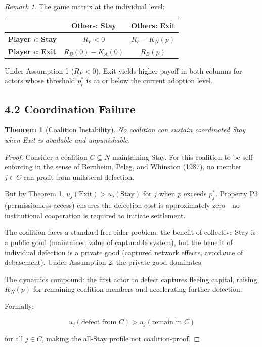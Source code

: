 \documentclass[12pt]{article}
\newtheorem{theorem}{Theorem}
\theoremstyle{definition}
\theoremstyle{remark}
\newtheorem*{remark}{Remark}
\begin{document}
\begin{remark}
The game matrix at the individual level:

\begin{table}[h]
\centering
\begin{tabular}{lcc}
\toprule
 & Others: Stay & Others: Exit \\
\midrule
\textbf{Player $i$: Stay} & $R_F < 0$ & $R_F - K_N(p)$ \\
\textbf{Player $i$: Exit} & $R_B(0) - K_A(0)$ & $R_B(p)$ \\
\bottomrule
\end{tabular}
\end{table}

Under Assumption 1 ($R_F < 0$), Exit yields higher payoff in both
columns for actors whose threshold $p_i^*$ is at or below the current
adoption level.
\end{remark}

\subsection{4.2 Coordination Failure}

\begin{theorem}[Coalition Instability]
No coalition can sustain coordinated Stay when Exit is available and
unpunishable.
\end{theorem}

\begin{proof}
Consider a coalition $C \subseteq N$ maintaining Stay. For this
coalition to be self-enforcing in the sense of Bernheim, Peleg, and
Whinston (1987), no member $j \in C$ can profit from unilateral
defection.

But by Theorem 1, $u_j(\text{Exit}) > u_j(\text{Stay})$ for $j$ when $p$ exceeds
$p_j^*$. Property P3 (permissionless access) ensures the defection cost
is approximately zero---no institutional cooperation is required to
initiate settlement.

The coalition faces a standard free-rider problem: the benefit of
collective Stay is a public good (maintained value of capturable system),
but the benefit of individual defection is a private good (captured
network effects, avoidance of debasement). Under Assumption 2, the
private good dominates.

The dynamics compound: the first actor to defect captures fleeing
capital, raising $K_N(p)$ for remaining coalition members and
accelerating further defection.

Formally:

\[
u_j(\text{defect from } C) > u_j(\text{remain in } C)
\]

for all $j \in C$, making the all-Stay profile not coalition-proof.
\end{proof}
\end{document}
